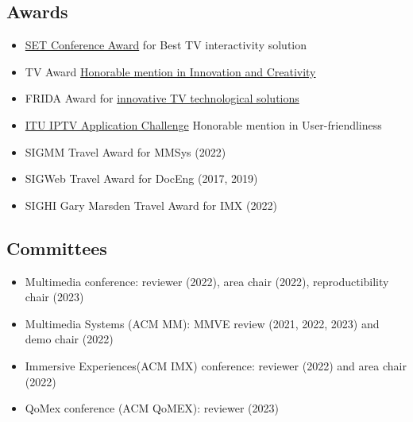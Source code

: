\documentclass[10pt,a4paper,sans,colorlinks]{moderncv}
\begin{document}
  \subsection{Awards}
    \begin{itemize}[mynosep]
      \item \href{http://set.org.br/artigos/ed137/137_revistadaset_70.pdf}{SET Conference Award} for Best TV interactivity solution
      \item  TV Award \href{https://www.premiotv.com/es/ganadores-es/ganadores-2013-es}{Honorable mention in Innovation and Creativity}
      \item  FRIDA Award for \href{https://programafrida.net/archivos/project/brasil-4d}{innovative TV technological solutions}
    \end{itemize}
    \begin{itemize}[mynosep]
      \item \href{https://itu.int/en/ITU-T/challenges/pages/iptv.aspx}{ITU IPTV Application Challenge} Honorable mention in User-friendliness
    \end{itemize}
    \begin{itemize}[mynosep]
      \item SIGMM Travel Award for MMSys (2022)
      \item SIGWeb Travel Award for DocEng (2017, 2019)
      \item SIGHI Gary Marsden Travel Award for IMX (2022)
    \end{itemize}

  \subsection{Committees}
    \begin{itemize}[mynosep]
      \item Multimedia conference: reviewer (2022), area chair (2022), reproductibility chair (2023)
      \item Multimedia Systems (ACM MM): MMVE review (2021, 2022, 2023) and demo chair (2022)
      \item Immersive Experiences(ACM IMX) conference: reviewer (2022) and area chair (2022)
      \item QoMex conference (ACM QoMEX): reviewer (2023)
    \end{itemize}
\end{document}

